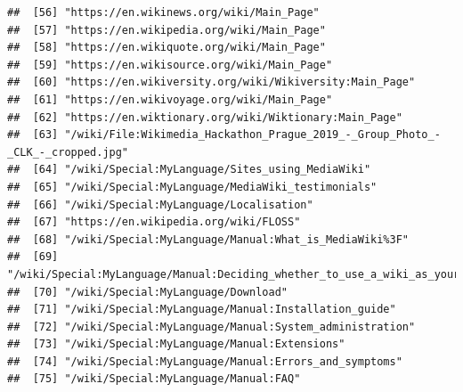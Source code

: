 \documentclass[
]{article}
\begin{document}
\begin{verbatim}
##  [56] "https://en.wikinews.org/wiki/Main_Page"                                                                                      
##  [57] "https://en.wikipedia.org/wiki/Main_Page"                                                                                     
##  [58] "https://en.wikiquote.org/wiki/Main_Page"                                                                                     
##  [59] "https://en.wikisource.org/wiki/Main_Page"                                                                                    
##  [60] "https://en.wikiversity.org/wiki/Wikiversity:Main_Page"                                                                       
##  [61] "https://en.wikivoyage.org/wiki/Main_Page"                                                                                    
##  [62] "https://en.wiktionary.org/wiki/Wiktionary:Main_Page"                                                                         
##  [63] "/wiki/File:Wikimedia_Hackathon_Prague_2019_-_Group_Photo_-_CLK_-_cropped.jpg"                                                
##  [64] "/wiki/Special:MyLanguage/Sites_using_MediaWiki"                                                                              
##  [65] "/wiki/Special:MyLanguage/MediaWiki_testimonials"                                                                             
##  [66] "/wiki/Special:MyLanguage/Localisation"                                                                                       
##  [67] "https://en.wikipedia.org/wiki/FLOSS"                                                                                         
##  [68] "/wiki/Special:MyLanguage/Manual:What_is_MediaWiki%3F"                                                                        
##  [69] "/wiki/Special:MyLanguage/Manual:Deciding_whether_to_use_a_wiki_as_your_website_type"                                         
##  [70] "/wiki/Special:MyLanguage/Download"                                                                                           
##  [71] "/wiki/Special:MyLanguage/Manual:Installation_guide"                                                                          
##  [72] "/wiki/Special:MyLanguage/Manual:System_administration"                                                                       
##  [73] "/wiki/Special:MyLanguage/Manual:Extensions"                                                                                  
##  [74] "/wiki/Special:MyLanguage/Manual:Errors_and_symptoms"                                                                         
##  [75] "/wiki/Special:MyLanguage/Manual:FAQ"                                                                                         

\end{verbatim}
\end{document}
